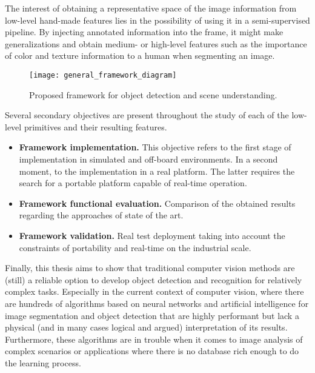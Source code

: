 The interest of obtaining a representative space of the image information from low-level hand-made features lies in the possibility of using it in a semi-supervised pipeline. By injecting annotated information into the frame, it might make generalizations and obtain medium- or high-level features such as the importance of color and texture information to a human when segmenting an image.

\begin{figure}[!ht]
    \centering
    \texttt{[image: general\_framework\_diagram]}        
    \caption{Proposed framework for object detection and scene understanding.}\label{fig:general_diagram_framework}
\end{figure}

Several secondary objectives are present throughout the study of each of the low-level primitives and their resulting features.

\begin{itemize}
	\item \textbf{Framework implementation.} This objective refers to the first stage of implementation in simulated and off-board environments. In a second moment, to the implementation in a real platform. The latter requires the search for a portable platform capable of real-time operation.
 
	\item \textbf{Framework functional evaluation.} Comparison of the obtained results regarding the approaches of state of the art.
 
 	\item \textbf{Framework validation.} Real test deployment taking into account the constraints of portability and real-time on the industrial scale.
 
\end{itemize}

Finally, this thesis aims to show that traditional computer vision methods are (still) a reliable option to develop object detection and recognition for relatively complex tasks. Especially in the current context of computer vision, where there are hundreds of algorithms based on neural networks and artificial intelligence for image segmentation and object detection that are highly performant but lack a physical (and in many cases logical and argued) interpretation of its results. Furthermore, these algorithms are in trouble when it comes to image analysis of complex scenarios or applications where there is no database rich enough to do the learning process.


